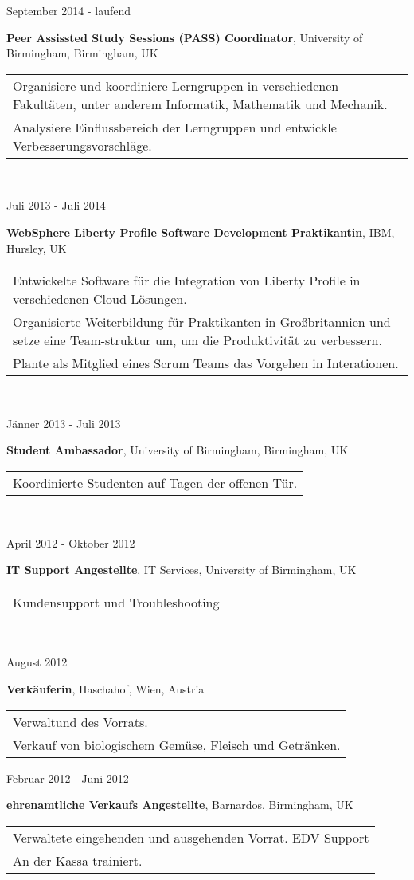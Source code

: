 \documentclass{article}
\newenvironment{changemargin}[2]{%
  \begin{list}{}{%
    \setlength{\topsep}{0pt}%
    \setlength{\leftmargin}{#1}%
    \setlength{\rightmargin}{#2}%
    \setlength{\listparindent}{\parindent}%
    \setlength{\itemindent}{\parindent}%
    \setlength{\parsep}{\parskip}%
  }%
  \item[]}{\end{list}
}
\newenvironment{body} {
	\vspace*{-16pt}
	\begin{changemargin}{0in}{0in}
  }	
	{
\end{changemargin}
\medskip
}
\newcommand{\paraW}[4]{
	\begin{minipage}[t]{0.6\textwidth}
	\textbf{#1}, #2, #3 \vspace{2pt}\\
	\begin{tabular}{p{10cm}}
		#4
	\end{tabular}
	\end{minipage}
	\medskip
}
\newcommand{\timerange}[1]{
	\begin{minipage}[t]{0.30\textwidth}
		#1
	\end{minipage}
}
\begin{document}
\begin{body}
	\vspace{14pt}
	
	\timerange{September 2014 - laufend}
	\paraW{Peer Assissted Study Sessions (PASS) Coordinator}{University of Birmingham}{Birmingham, UK}{
		Organisiere und koordiniere Lerngruppen in verschiedenen Fakultäten, unter anderem Informatik, Mathematik und Mechanik.\\
		Analysiere Einflussbereich der Lerngruppen und entwickle Verbesserungsvorschläge.
	}\\
	
	\timerange{Juli 2013 - Juli 2014}
	\paraW{WebSphere Liberty Profile Software Development Praktikantin}{IBM}{Hursley, UK}{
		Entwickelte Software für die Integration von Liberty Profile in verschiedenen Cloud L{\"o}sungen.\\
		Organisierte Weiterbildung f{\"u}r Praktikanten in Großbritannien und setze eine Team-struktur um, um die Produktivität zu verbessern. \\
		Plante als Mitglied eines Scrum Teams das Vorgehen in Interationen.\\
	}\\
	
	\timerange{J{\"a}nner 2013 - Juli 2013}
	\paraW{Student Ambassador}{University of Birmingham}{Birmingham, UK}{
		Koordinierte Studenten auf Tagen der offenen Tür.	
	}\\
	
	\timerange{April 2012 - Oktober 2012}
	\paraW{IT Support Angestellte}{IT Services}{University of Birmingham, UK}{
		Kundensupport und Troubleshooting
	}\\

	\timerange{August 2012}
	\paraW{Verkäuferin}{Haschahof}{Wien, Austria}{
		Verwaltund des Vorrats.\\ %
		Verkauf von biologischem Gemüse, Fleisch und Getränken. \\
	}
	
	\timerange{Februar 2012 - Juni 2012}
	\paraW{ehrenamtliche Verkaufs Angestellte}{Barnardos}{Birmingham, UK}{
		Verwaltete eingehenden und ausgehenden Vorrat.
		EDV Support\\
		An der Kassa trainiert.\\
	}


\end{body}
\end{document}

